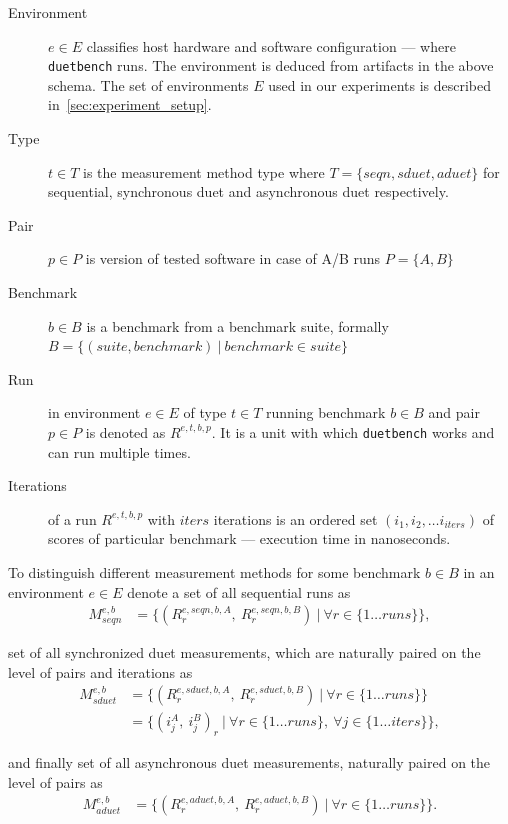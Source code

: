 \begin{description}
    \item[Environment] $e \in E$ classifies host hardware and software configuration --- where \lstinline{duetbench} runs.
        The environment is deduced from artifacts in the above schema.
        The set of environments $E$ used in our experiments is described in~\cref{sec:experiment_setup}.
    \item[Type] $t \in T$ is the measurement method type where $T = \{seqn, sduet, aduet\}$ for sequential, synchronous duet and asynchronous duet respectively.
    \item[Pair] $p \in P$ is version of tested software in case of A/B runs $P = \{A, B\}$
    \item[Benchmark] $b \in B$ is a benchmark from a benchmark suite, formally $B = \{(suite, benchmark)~|~benchmark \in suite \}$
    \item[Run] in environment $e \in E$ of type $t \in T$ running benchmark $b \in B$ and pair $p \in P$ is denoted as $R^{e, t, b, p}$.
        It is a unit with which \lstinline{duetbench} works and can run multiple times.
    \item[Iterations] of a run $R^{e, t, b, p}$ with $iters$ iterations is an ordered set $(i_1, i_2, \dots i_{iters})$ of scores of particular benchmark --- execution time in nanoseconds.
\end{description}

To distinguish different measurement methods for some benchmark $b \in B$ in an environment $e \in E$ denote a set of all sequential runs as
\begin{align*}
M^{e, b}_{seqn} &= \{(R^{e, seqn, b, A}_r,~R^{e, seqn, b, B}_r)~|~\forall r \in \{1 \dots runs\}\},
\end{align*}

set of all synchronized duet measurements, which are naturally paired on the level of pairs and iterations as
\begin{align*}
M^{e, b}_{sduet} &= \{(R^{e, sduet, b, A}_r,~R^{e, sduet, b, B}_r)~|~\forall r \in \{1 \dots runs\}\}\\
                 &= \{(i^A_j,~i^B_j)_r~|~\forall r \in \{1 \dots runs\},~\forall j \in \{1 \dots iters\}\},
\end{align*}

and finally set of all asynchronous duet measurements, naturally paired on the level of pairs as
\begin{align*}
M^{e, b}_{aduet} &= \{(R^{e, aduet, b, A}_r,~R^{e, aduet, b, B}_r)~|~\forall r \in \{1 \dots runs\}\}.
\end{align*}

